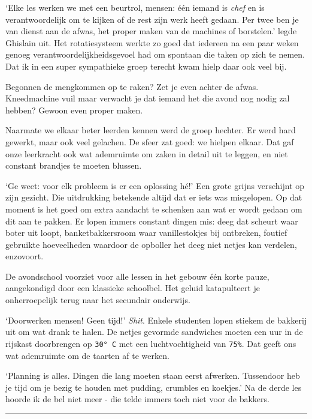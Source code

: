 \documentclass[
  11pt,
  dutch,
]{memoir}
\begin{document}
`Elke les werken we met een beurtrol, mensen: één iemand is \emph{chef}
en is verantwoordelijk om te kijken of de rest zijn werk heeft gedaan.
Per twee ben je van dienst aan de afwas, het proper maken van de
machines of borstelen.' legde Ghislain uit. Het rotatiesysteem werkte zo
goed dat iedereen na een paar weken genoeg verantwoordelijkheidsgevoel
had om spontaan die taken op zich te nemen. Dat ik in een super
sympathieke groep terecht kwam hielp daar ook veel bij.

Begonnen de mengkommen op te raken? Zet je even achter de afwas.
Kneedmachine vuil maar verwacht je dat iemand het die avond nog nodig
zal hebben? Gewoon even proper maken.

Naarmate we elkaar beter leerden kennen werd de groep hechter. Er werd
hard gewerkt, maar ook veel gelachen. De sfeer zat goed: we hielpen
elkaar. Dat gaf onze leerkracht ook wat ademruimte om zaken in detail
uit te leggen, en niet constant brandjes te moeten blussen.

`Ge weet: voor elk probleem is er een oplossing hé!' Een grote grijns
verschijnt op zijn gezicht. Die uitdrukking betekende altijd dat er iets
was misgelopen. Op dat moment is het goed om extra aandacht te schenken
aan wat er wordt gedaan om dit aan te pakken. Er lopen immers constant
dingen mis: deeg dat scheurt waar boter uit loopt, banketbakkersroom
waar vanillestokjes bij ontbreken, foutief gebruikte hoeveelheden
waardoor de opboller het deeg niet netjes kan verdelen, enzovoort.

De avondschool voorziet voor alle lessen in het gebouw één korte pauze,
aangekondigd door een klassieke schoolbel. Het geluid katapulteert je
onherroepelijk terug naar het secundair onderwijs.

`Doorwerken mensen! Geen tijd!' \emph{Shit}. Enkele studenten lopen
stiekem de bakkerij uit om wat drank te halen. De netjes gevormde
sandwiches moeten een uur in de rijskast doorbrengen op \texttt{30°\ C}
met een luchtvochtigheid van \texttt{75\%}. Dat geeft ons wat ademruimte
om de taarten af te werken.

`Planning is alles. Dingen die lang moeten staan eerst afwerken.
Tussendoor heb je tijd om je bezig te houden met pudding, crumbles en
koekjes.' Na de derde les hoorde ik de bel niet meer - die telde immers
toch niet voor de bakkers.

\pfbreak
\end{document}
